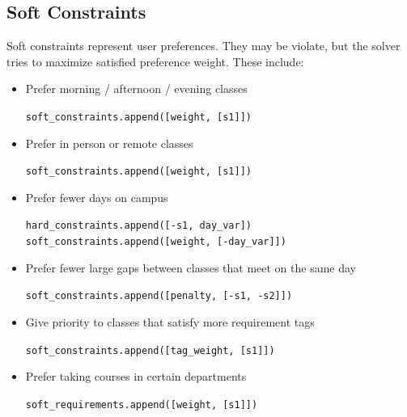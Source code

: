 \documentclass[11pt, a4paper]{article} %
\newcommand{\<}{\langle}
\renewcommand{\>}{\rangle}
\begin{document}
\subsection*{Soft Constraints}
Soft constraints represent user preferences. They may be violate, but the solver tries to maximize satisfied preference weight. These include:
\begin{itemize}
    \vspace{-2mm}
    \setlength{\itemsep}{-.2em}
    \item[$\bigstar$] Prefer morning / afternoon / evening classes
    \begin{algorithmic}
        \State \texttt{soft\_constraints.append([weight, [s1]])}
        \EndIf
    \end{algorithmic}
    \item[$\bigstar$] Prefer in person or remote classes
    \begin{algorithmic}
        \State \texttt{soft\_constraints.append([weight, [s1]])}
        \EndIf
    \end{algorithmic}
    \item[$\bigstar$] Prefer fewer days on campus
    \begin{algorithmic}
          \State \texttt{hard\_constraints.append([-s1, day\_var])}
      \EndIf
      \State \texttt{soft\_constraints.append([weight, [-day\_var]])}
  \end{algorithmic}
    \item[$\bigstar$] Prefer fewer large gaps between classes that meet on the same day
    \begin{algorithmic}
            \State \texttt{soft\_constraints.append([penalty, [-s1, -s2]])}
        \EndIf
  \end{algorithmic}
    \item[$\bigstar$] Give priority to classes that satisfy more requirement tags
    \begin{algorithmic}
              \State \texttt{soft\_constraints.append([tag\_weight, [s1]])}
        \EndIf
    \end{algorithmic}
    \item[$\bigstar$] Prefer taking courses in certain departments
    \begin{algorithmic}
        \State \texttt{soft\_requirements.append([weight, [s1]])}
        \EndIf
    \end{algorithmic}
\end{itemize}
\end{document}
